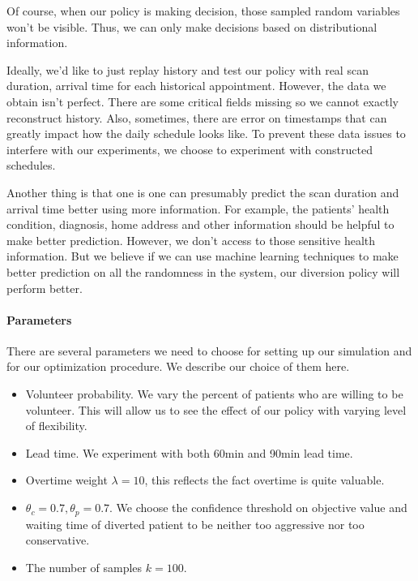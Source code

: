 Of course, when our policy is making decision, those sampled random variables
won't be visible. Thus, we can only make decisions based on distributional
information.

Ideally, we'd like to just replay history and test our policy with real
scan duration, arrival time for each historical appointment. However,
the data we obtain isn't perfect. There are some critical fields missing
so we cannot exactly reconstruct history. Also, sometimes, there are
error on timestamps that can greatly impact how the daily schedule looks like.
To prevent these data issues to interfere with our experiments, we choose
to experiment with constructed schedules.

Another thing is that one is one can presumably predict the scan duration and
arrival time better using more information. For example, the patients'
health condition, diagnosis, home address and other information should be
helpful to make better prediction. However, we don't access to those
sensitive health information. But we believe if we can use machine learning
techniques to make better prediction on all the randomness in the system,
our diversion policy will perform better.

\paragraph{Parameters}

There are several parameters we need to choose for setting up our simulation
and for our optimization procedure. We describe our choice of them here.

\begin{itemize}
  \item Volunteer probability. We vary the percent of patients who are willing
    to be volunteer. This will allow us to see the effect of our policy
    with varying level of flexibility.
  \item Lead time. We experiment with both 60min and 90min lead time.
  \item Overtime weight $\lambda = 10$, this reflects the fact overtime is quite valuable.
  \item $\theta_c = 0.7, \theta_p = 0.7$. We choose the confidence threshold on objective value
    and waiting time of diverted patient to be neither too aggressive nor too conservative.
  \item The number of samples $k=100$.
\end{itemize}
